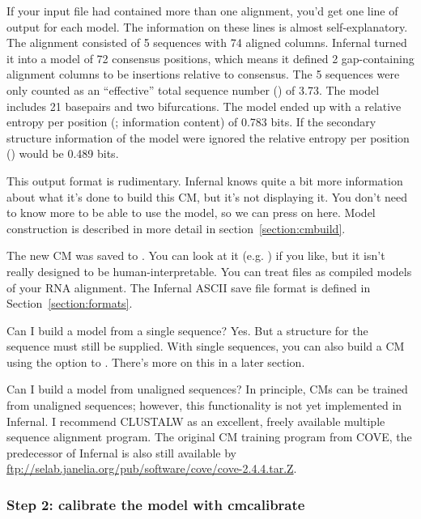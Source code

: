 If your input file had contained more than one alignment, you'd get
one line of output for each model. The information on these lines is
almost self-explanatory. The  alignment consisted of 5
sequences with 74 aligned columns. Infernal turned it into a model of
72 consensus positions, which means it defined 2 gap-containing
alignment columns to be insertions relative to consensus. The 5
sequences were only counted as an ``effective'' total sequence number
() of 3.73. The model includes 21 basepairs and two
bifurcations. The model ended up with a relative entropy per position
(; information content) of 0.783 bits. If the
secondary structure information of the model were ignored the relative
entropy per position () would be 0.489 bits.

This output format is rudimentary. Infernal knows quite a bit more
information about what it's done to build this CM, but it's not
displaying it. You don't need to know more to be able to use the
model, so we can press on here. Model construction is described in
more detail in section~\ref{section:cmbuild}.

The new CM was saved to . You can look at it
(e.g. ) if you like, but it isn't really designed
to be human-interpretable. You can treat  files as compiled
models of your RNA alignment. The Infernal ASCII save file format is
defined in Section~\ref{section:formats}.

\begin{srefaq}{Can I build a model from a single sequence?}
Yes. But a structure for the sequence must still be supplied.
With single sequences, you can also build a  \cite{KleinEddy03} CM 
using the  option to . There's more on
this in a later section.
\end{srefaq}

\begin{srefaq}{Can I build a model from unaligned sequences?}
In principle, CMs can be trained from unaligned sequences;
however, this functionality is not yet implemented in Infernal.  I
recommend CLUSTALW as an excellent, freely available multiple sequence
alignment program. The original  CM training
program from COVE, the predecessor of Infernal is also
still available by
\url{ftp://selab.janelia.org/pub/software/cove/cove-2.4.4.tar.Z}.
\end{srefaq}

\subsubsection{Step 2: calibrate the model with cmcalibrate}

